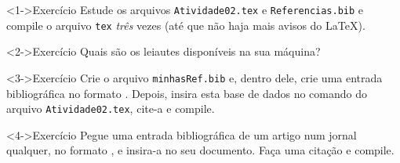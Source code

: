 \documentclass[handout,10pt]{beamer}
\begin{document}
\begin{frame}
	\small
	
	\begin{block}<1->{Exercício}
		Estude os arquivos \texttt{Atividade02.tex} e \texttt{Referencias.bib}
		e compile o arquivo \texttt{tex} \emph{três} vezes (até que não haja
		mais avisos do \LaTeX).
	\end{block}\vfill
	
	\begin{block}<2->{Exercício}
		Quais são os leiautes disponíveis na sua máquina?
	\end{block}\vfill
	
	\begin{block}<3->{Exercício}
		Crie o arquivo \texttt{minhasRef.bib} e, dentro dele, crie uma
		entrada bibliográfica no formato \bibtex. Depois, insira esta base de
		dados no comando  do arquivo \texttt{Atividade02.tex},
		cite-a e compile.
	\end{block}\vfill
	
	\begin{block}<4->{Exercício}
		Pegue uma entrada bibliográfica de um artigo num jornal qualquer, no
		formato \bibtex, e insira-a no seu documento. Faça uma citação e compile.	
	\end{block}
	
\end{frame}
\end{document}
